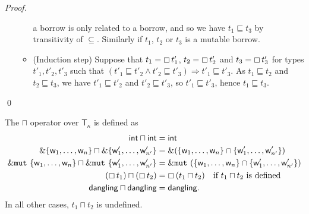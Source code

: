 \begin{proof}
\begin{itemize}
\begin{itemize}
      a borrow is only related to a borrow, and so we have
      $t_1\sqsubseteq t_3$ by transitivity of $\subseteq$.
      Similarly if $t_1$, $t_2$ or $t_3$ is a mutable borrow.
      \item (Induction step) Suppose that $t_1=\boxempty\,{t'_1}$,
      $t_2=\boxempty\,{t'_2}$ and $t_3=\boxempty\,{t'_3}$ for types
      $t'_1,t'_2,t'_3$ such that
      $(t'_1 \sqsubseteq t'_2 \land t'_2 \sqsubseteq t'_3) \Rightarrow
      t'_1 \sqsubseteq t'_3$.
      As $t_1 \sqsubseteq t_2$ and $t_2 \sqsubseteq t_3$, we have
      $t'_1 \sqsubseteq t'_2$ and $t'_2 \sqsubseteq t'_3$, so
      $t'_1 \sqsubseteq t'_3$, hence $t_1 \sqsubseteq t_3$.
    \end{itemize}
  \end{itemize}
  \qed
\end{proof}

\begin{definition}
  The $\sqcap$ operator over $\mathsf{T}_\kappa$ is defined as
  \begin{align*}
    \mathsf{int}\sqcap\mathsf{int} &= \mathsf{int}\\
    \&\{\mathsf{w}_1,\ldots,\mathsf{w}_n\} \sqcap \&\{\mathsf{w}'_1,\ldots,\mathsf{w}'_{n'}\} &= \&(\{\mathsf{w}_1,\ldots,\mathsf{w}_n\}\cap\{\mathsf{w}'_1,\ldots,\mathsf{w}'_{n'}\})\\
    \&\mathtt{mut}\ \{\mathsf{w}_1,\ldots,\mathsf{w}_n\} \sqcap \&\mathtt{mut}\ \{\mathsf{w}'_1,\ldots,\mathsf{w}'_{n'}\} &= \&\mathtt{mut}\ (\{\mathsf{w}_1,\ldots,\mathsf{w}_n\}\cap\{\mathsf{w}'_1,\ldots,\mathsf{w}'_{n'}\})\\
    (\boxempty\,{t_1}) \sqcap (\boxempty\,{t_2}) &=\boxempty\,{(t_1\sqcap t_2)}\quad\text{if $t_1\sqcap t_2$ is defined}\\
    \mathsf{dangling}\sqcap\mathsf{dangling} &= \mathsf{dangling}.
  \end{align*}
  In all other cases, $t_1\sqcap t_2$ is undefined.
\end{definition}

